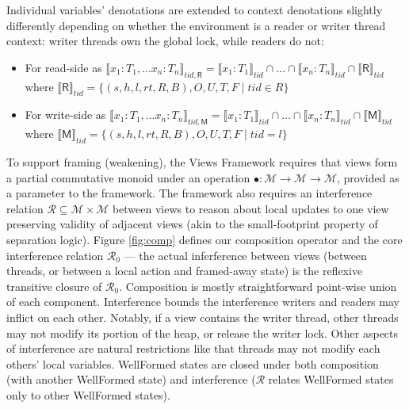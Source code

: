 Individual variables' denotations are extended to context denotations slightly differently depending on whether the environment is a reader or writer thread context: writer threads own the global lock, while readers do not:
\begin{itemize}
\item For read-side as $\llbracket x_1 : T_1, \ldots x_n : T_n \rrbracket_{tid,\textsf{R}} = \llbracket x_1 : T_1 \rrbracket_{tid} \cap \ldots \cap \llbracket x_n : T_n \rrbracket_{tid} \cap \llbracket \textsf{R} \rrbracket_{tid}$ where
$\llbracket \textsf{R} \rrbracket_{tid} = \{ (s,h,l,rt,R,B),O,U,T,F  \mid tid \in R \}$

\item For write-side as $\llbracket x_1 : T_1, \ldots x_n : T_n \rrbracket_{tid,\textsf{M}} = \llbracket x_1 : T_1 \rrbracket_{tid} \cap \ldots \cap \llbracket x_n : T_n \rrbracket_{tid} \cap \llbracket \textsf{M} \rrbracket_{tid}$ where
$\llbracket \textsf{M} \rrbracket_{tid} = \{ (s,h,l,rt,R,B),O,U,T,F  \mid tid = l \}$
%
\end{itemize}

To support framing (weakening), the Views Framework requires that views form a partial commutative monoid under an operation $\bullet : \mathcal{M} \longrightarrow \mathcal{M} \longrightarrow \mathcal{M}$, provided as a parameter to the framework.
The framework also requires an interference relation $\mathcal{R}\subseteq\mathcal{M}\times\mathcal{M}$ between views to reason about local updates to one view preserving validity of adjacent views (akin to the small-footprint property of separation logic).
Figure \ref{fig:comp} defines our composition operator and the core interference relation $\mathcal{R}_0$ --- the actual inferference between views (between threads, or between a local action and framed-away state) is the reflexive transitive closure of $\mathcal{R}_0$.
Composition is mostly straightforward point-wise union of each component.
Interference bounds the interference writers and readers may inflict on each other.  Notably, if a view contains the writer thread, other threads may not modify its portion of the heap, or release the writer lock.  Other aspects of interference are natural restrictions like that threads may not modify each others' local variables.
\textsf{WellFormed} states are closed under both composition (with another \textsf{WellFormed} state) and interference ($\mathcal{R}$ relates \textsf{WellFormed} states only to other \textsf{WellFormed} states).

